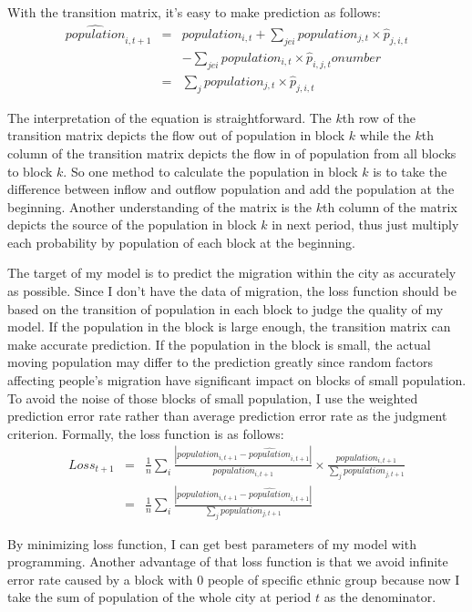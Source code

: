 \documentclass{article}
\begin{document}
With the transition matrix, it’s easy to make prediction as follows:
\begin{eqnarray} 
\widehat{population}_{i,t+1} &=& population_{i,t} + \sum_{je i} population_{j,t}\times \hat{p}_{j,i,t} \nonumber\\ 
&\;& - \sum_{je i} population_{i,t}\times \hat{p}_{i,j,t} onumber\\ 
&=& \sum_{j} population_{j,t}\times \hat{p}_{j,i,t} 
\end{eqnarray}
\par The interpretation of the equation is straightforward. The $k$th row of the transition matrix depicts the flow out of population in block $k$ while the $k$th column of the transition matrix depicts the flow in of population from all blocks to block $k$. So one method to calculate the population in block $k$ is to take the difference between inflow and outflow population and add the population at the beginning. Another understanding of the matrix is the $k$th column of the matrix depicts the source of the population in block $k$ in next period, thus just multiply each probability by population of each block at the beginning.
\par The target of my model is to predict the migration within the city as accurately as possible. Since I don’t have the data of migration, the loss function should be based on the transition of population in each block to judge the quality of my model. If the population in the block is large enough, the transition matrix can make accurate prediction. If the population in the block is small, the actual moving population may differ to the prediction greatly since random factors affecting people’s migration have significant impact on blocks of small population. To avoid the noise of those blocks of small population, I use the weighted prediction error rate rather than average prediction error rate as the judgment criterion. Formally, the loss function is as follows:
\begin{eqnarray} 
Loss_{t+1} &=& \frac{1}{n} \sum_{i} \frac{|population_{i,t+1} - \widehat{population}_{i,t+1}|}{population_{i,t+1}} \times \frac{population_{i,t+1}}{\sum_j population_{j,t+1}} \nonumber \\
&=& \frac{1}{n} \sum_{i} \frac{|population_{i,t+1} - \widehat{population}_{i,t+1}|}{\sum_j population_{j,t+1}}
\end{eqnarray}
\par By minimizing loss function, I can get best parameters of my model with programming. Another advantage of that loss function is that we avoid infinite error rate caused by a block with 0 people of specific ethnic group because now I take the sum of population of the whole city at period $t$ as the denominator.
\end{document}
